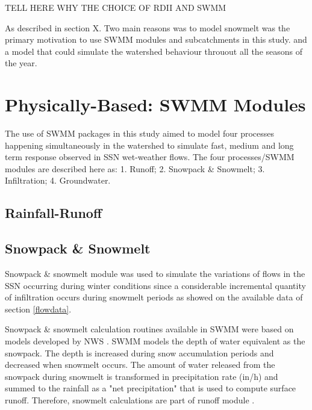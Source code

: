 TELL HERE WHY THE CHOICE OF RDII AND SWMM

As described in section X. Two main reasons was to model snowmelt was the primary motivation to use SWMM modules and subcatchments in this study. and a model that could simulate the watershed behaviour throuout all the seasons of the year. 

\section{Physically-Based: SWMM Modules}

The use of SWMM packages in this study aimed to model four processes happening simultaneously in the watershed to simulate fast, medium and long term response observed in \ac{SSN} wet-weather flows. The four processes/SWMM modules are described here as: 1. Runoff; 2. Snowpack \& Snowmelt; 3. Infiltration; 4. Groundwater. 


\subsection{Rainfall-Runoff} 


\subsection{Snowpack \& Snowmelt} 

Snowpack \& snowmelt module was used to simulate the variations of flows in the \acf{SSN} occurring during winter conditions since a considerable incremental quantity of infiltration occurs during snowmelt periods as showed on the available data of section \ref{flowdata}.

Snowpack \& snowmelt calculation routines available in SWMM were based on models developed by \acf{NWS} \cite{anderson1973,anderson2006}. SWMM models the depth of water equivalent as the snowpack. The depth is increased during snow accumulation periods and decreased when snowmelt occurs. The amount of water released from the snowpack during snowmelt is transformed in precipitation rate (in/h) and summed to the rainfall as a "net precipitation" that is used to compute surface runoff. Therefore, snowmelt calculations are part of runoff module \cite{Rossman2016}.


